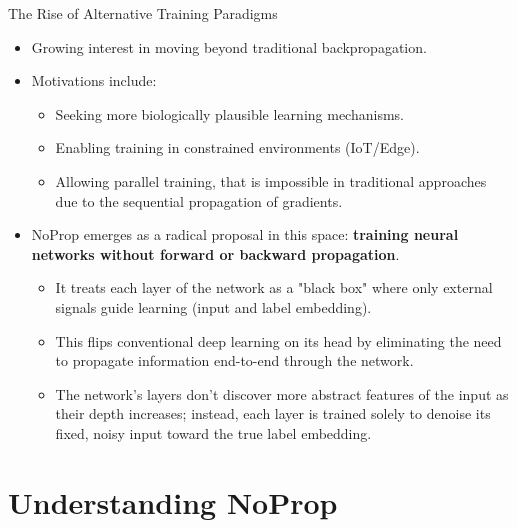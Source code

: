 \documentclass{beamer}
\begin{document}
\begin{frame}{The Rise of Alternative Training Paradigms}
    \begin{itemize}
        \item Growing interest in moving beyond traditional backpropagation.
        \item Motivations include:
        \begin{itemize}
            \item Seeking more biologically plausible learning mechanisms.
            \item Enabling training in constrained environments (IoT/Edge).
            \item Allowing parallel training, that is impossible in traditional approaches due to the sequential propagation of gradients.
        \end{itemize}
        \item NoProp emerges as a radical proposal in this space: \textbf{training neural networks without forward or backward propagation}.

        \begin{itemize}
        \item It treats each layer of the network as a "black box" where only external signals guide learning (input and label embedding).
        \item This flips conventional deep learning on its head by eliminating the need to propagate information end-to-end through the network.
      \item The network's layers don't discover more abstract features of the input as their depth increases; instead, each layer is trained solely to denoise its fixed, noisy input toward the true label embedding.
        \end{itemize}

        
    \end{itemize}
\end{frame}


\section{Understanding NoProp}
\end{document}

